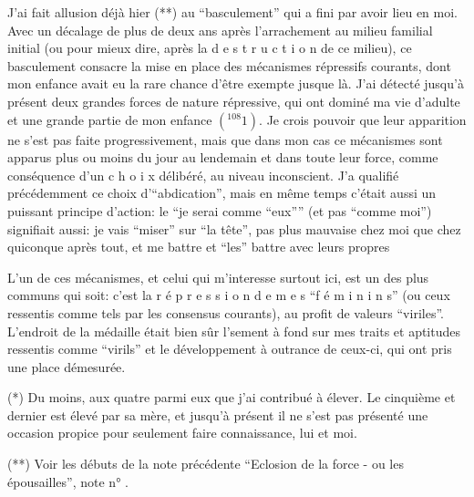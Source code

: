 J'ai fait allusion déjà hier (**) au ``basculement'' qui a fini par avoir lieu en moi. Avec un décalage de plus de deux ans après l'arrachement au milieu familial initial (ou pour mieux dire, après la d e s t r u c t i o n de ce milieu), ce basculement consacre la mise en place des mécanismes répressifs courants, dont mon enfance avait eu la rare chance d'être exempte jusque là. J'ai détecté jusqu'à présent deux grandes forces de nature répressive, qui ont dominé ma vie d'adulte et une grande partie de mon enfance $({}^{108}1)$. Je crois pouvoir  que leur apparition ne s'est pas faite progressivement, mais que dans mon cas ce mécanismes sont apparus plus ou moins du jour au lendemain et dans toute leur force, comme conséquence d'un c h o i x délibéré, au niveau inconscient. J'a qualifié précédemment ce choix d'``abdication'', mais en même temps c'était aussi un puissant principe d'action: le ``je serai comme ``eux'''' (et pas ``comme moi'') signifiait aussi: je vais ``miser'' sur ``la tête'', pas plus mauvaise chez moi que chez quiconque après tout, et me battre et ``les'' battre avec leurs propres 

L'un de ces mécanismes, et celui qui m'interesse surtout ici, est un des plus communs qui soit: c'est la r é p r e s s i o n d e m e s  ``f é m i n i n s'' (ou ceux ressentis comme tels par les consensus courants), au profit de valeurs ``viriles''. L'endroit de la médaille était bien sûr l'\newline sement à fond sur mes traits et aptitudes ressentis comme ``virils'' et le dévelop\inserted{-}\newline pement à outrance de ceux-ci, qui ont pris une place démesurée.


(*) Du moins, aux quatre parmi eux que j'ai contribué à élever. Le cinquième et dernier est élevé par sa mère, et jusqu'à présent il ne s'est pas présenté une occasion propice pour seulement faire connaissance, lui et moi.

(**) Voir les débuts de la note précédente ``Eclosion de la force - ou les épousailles'', note n° .

